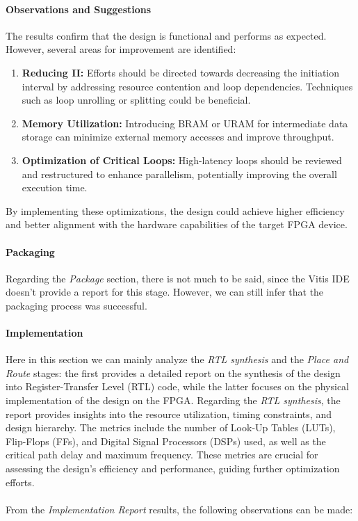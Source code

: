\documentclass{article}
\begin{document}
\paragraph{Observations and Suggestions}
The results confirm that the design is functional and performs as expected. However, several areas for improvement are identified:
\begin{enumerate}
    \item \textbf{Reducing II:} Efforts should be directed towards decreasing the initiation interval by addressing resource contention and loop dependencies. Techniques such as loop unrolling or splitting could be beneficial.
    \item \textbf{Memory Utilization:} Introducing BRAM or URAM for intermediate data storage can minimize external memory accesses and improve throughput.
    \item \textbf{Optimization of Critical Loops:} High-latency loops should be reviewed and restructured to enhance parallelism, potentially improving the overall execution time.
\end{enumerate}

By implementing these optimizations, the design could achieve higher efficiency and better alignment with the hardware capabilities of the target FPGA device.

\paragraph{Packaging}
Regarding the \textit{Package} section, there is  not much to be said, since the Vitis IDE doesn't provide a report for this stage. However, we can still infer that the packaging process was successful.

\paragraph{Implementation}

Here in this section we can mainly analyze the \textit{RTL synthesis} and the \textit{Place and Route} stages: the first provides a detailed report on the synthesis of the design into Register-Transfer Level (RTL) code, while the latter focuses on the physical implementation of the design on the FPGA.
Regarding the \textit{RTL synthesis}, the report provides insights into the resource utilization, timing constraints, and design hierarchy. The metrics include the number of Look-Up Tables (LUTs), Flip-Flops (FFs), and Digital Signal Processors (DSPs) used, as well as the critical path delay and maximum frequency. These metrics are crucial for assessing the design's efficiency and performance, guiding further optimization efforts.
\\\\ From the \textit{Implementation Report} results, the following observations can be made:
\end{document}
